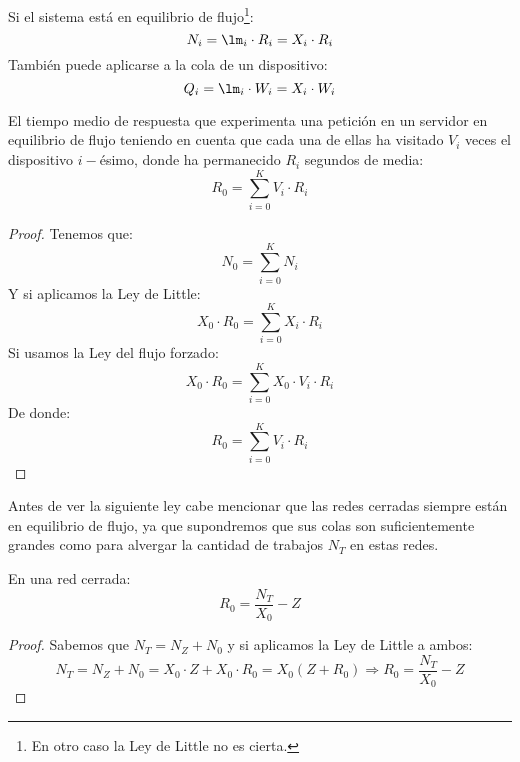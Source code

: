 \begin{prop}
    Si el sistema está en equilibrio de flujo\footnote{En otro caso la Ley de Little no es cierta.}:
    \begin{equation*}
        N_i = \lm_i \cdot R_i = X_i\cdot R_i
    \end{equation*}
    También puede aplicarse a la cola de un dispositivo:
    \begin{equation*}
        Q_i = \lm_i \cdot W_i = X_i\cdot W_i
    \end{equation*}
\end{prop}

\begin{prop}
    El tiempo medio de respuesta que experimenta una petición en un servidor en equilibrio de flujo teniendo en cuenta que cada una de ellas ha visitado $V_i$ veces el dispositivo $i-$ésimo, donde ha permanecido $R_i$ segundos de media:
    \begin{equation*}
        R_0 = \sum_{i=0}^{K} V_i \cdot R_i
    \end{equation*}
    \begin{proof}
        Tenemos que:
        \begin{equation*}
            N_0 = \sum_{i=0}^{K}N_i
        \end{equation*}
        Y si aplicamos la Ley de Little:
        \begin{equation*}
            X_0 \cdot R_0 = \sum_{i=0}^{K}X_i\cdot R_i
        \end{equation*}
        Si usamos la Ley del flujo forzado:
        \begin{equation*}
            X_0 \cdot R_0 = \sum_{i=0}^{K}X_0\cdot V_i\cdot R_i
        \end{equation*}
        De donde:
        \begin{equation*}
            R_0 = \sum_{i=0}^{K}V_i\cdot R_i
        \end{equation*}
    \end{proof}
\end{prop}

Antes de ver la siguiente ley cabe mencionar que las redes cerradas siempre están en equilibrio de flujo, ya que supondremos que sus colas son suficientemente grandes como para alvergar la cantidad de trabajos $N_T$ en estas redes.

\begin{prop}
    En una red cerrada:
    \begin{equation*}
        R_0 = \dfrac{N_T}{X_0} - Z
    \end{equation*}
    \begin{proof}
        Sabemos que $N_T = N_Z + N_0$ y si aplicamos la Ley de Little a ambos:
        \begin{equation*}
            N_T = N_Z + N_0 = X_0 \cdot Z + X_0\cdot R_0 = X_0(Z+R_0) \Longrightarrow R_0 = \dfrac{N_T}{X_0}-Z
        \end{equation*}
    \end{proof}
\end{prop}

